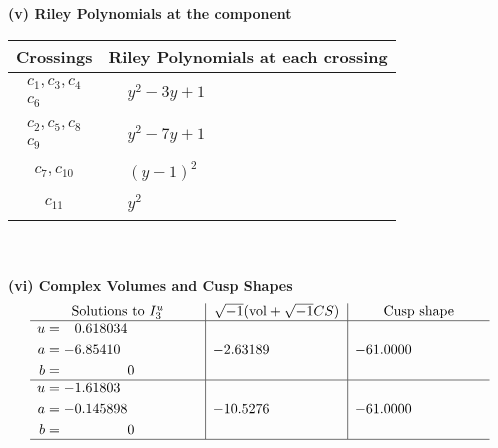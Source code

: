 \documentclass[1p]{elsarticle_modified}
\theoremstyle{definition}
\newcommand{\I}{\sqrt{-1}}
\begin{document}
\newpage\renewcommand{\arraystretch}{1}
\flushleft \textbf{(v) Riley Polynomials at the component}\newline \\
\begin{tabular}{m{50pt}|m{274pt}}
Crossings & \hspace{64pt}Riley Polynomials at each crossing \\
\hline $$\begin{aligned}c_{1},c_{3},c_{4}\\c_{6}\end{aligned}$$&$\begin{aligned}
&y^2-3 y+1
\end{aligned}$\\
\hline $$\begin{aligned}c_{2},c_{5},c_{8}\\c_{9}\end{aligned}$$&$\begin{aligned}
&y^2-7 y+1
\end{aligned}$\\
\hline $$\begin{aligned}c_{7},c_{10}\end{aligned}$$&$\begin{aligned}
&(y-1)^2
\end{aligned}$\\
\hline $$\begin{aligned}c_{11}\end{aligned}$$&$\begin{aligned}
&y^2
\end{aligned}$\\
\hline
\end{tabular}\\~\\
\newpage\flushleft \textbf{(vi) Complex Volumes and Cusp Shapes}
$$\begin{array}{c|c|c}  
\text{Solutions to }I^u_{3}& \I (\text{vol} + \sqrt{-1}CS) & \text{Cusp shape}\\
 \hline 
\begin{aligned}
u &= \phantom{-}0.618034\phantom{ +0.000000I} \\
a &= -6.85410\phantom{ +0.000000I} \\
b &= \phantom{-0.000000 } 0\end{aligned}
 & -2.63189\phantom{ +0.000000I} & -61.0000\phantom{ +0.000000I} \\ \hline\begin{aligned}
u &= -1.61803\phantom{ +0.000000I} \\
a &= -0.145898\phantom{ +0.000000I} \\
b &= \phantom{-0.000000 } 0\end{aligned}
 & -10.5276\phantom{ +0.000000I} & -61.0000\phantom{ +0.000000I}\\
 \hline 
 \end{array}$$\newpage
\end{document}
